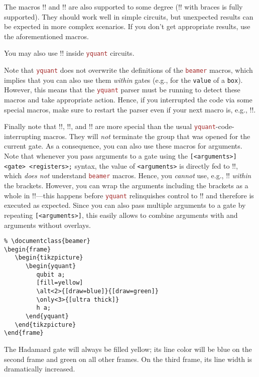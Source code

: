 \documentclass{scrartcl}
\def\pkg#1{\textcolor{brown}{\texttt{#1}}}
\def\ttlink{\link\texttt}
\def\Yquant{\pkg{yquant}}
\begin{document}
         The macros \tex!\pause! and \tex!\uncover! are also supported to some degree (\tex!\uncover! with braces is fully supported).
         They should work well in simple circuits, but unexpected results can be expected in more complex scenarios.
         If you don't get appropriate results, use the aforementioned macros.

         You may also use \tex!\note! inside \Yquant{} circuits.

         Note that \Yquant{} does not overwrite the definitions of the \pkg{beamer} macros, which implies that you can also use them \emph{within} gates (e.g., for the \ttlink{value} of a \ttlink{box}).
         However, this means that the \Yquant{} parser must be running to detect these macros and take appropriate action.
         Hence, if you interrupted the code via some special macros, make sure to restart the parser even if your next macro is, e.g., \tex!\only!.

         Finally note that \tex!\only!, \tex!\alt!, and \tex!\temporal! are more special than the usual \Yquant\hyp code\hyp interrupting macros.
         They will \emph{not} terminate the group that was opened for the current gate.
         As a consequence, you can also use these macros for arguments.
         Note that whenever you pass arguments to a gate using the \texttt{[<arguments>] <gate> <registers>;} syntax, the value of \texttt{<arguments>} is directly fed to \tex!\pgfkeys!, which \emph{does not} understand \pkg{beamer} macros.
         Hence, you \emph{cannot} use, e.g., \tex!\only! \emph{within} the brackets.
         However, you can wrap the arguments including the brackets as a whole in \tex!\only!---this happens before \Yquant{} relinquishes control to \tex!\pgfkeys! and therefore is executed as expected.
         Since you can also pass multiple arguments to a gate by repeating \texttt{[<arguments>]}, this easily allows to combine arguments with and arguments without overlays.
         \begin{example}
            \begin{verbatim}
% \documentclass{beamer}
\begin{frame}
   \begin{tikzpicture}
      \begin{yquant}
         qubit a;
         [fill=yellow]
         \alt<2>{[draw=blue]}{[draw=green]}
         \only<3>{[ultra thick]}
         h a;
      \end{yquant}
   \end{tikzpicture}
\end{frame}
            \end{verbatim}
            The Hadamard gate will always be filled yellow; its line color will be blue on the second frame and green on all other frames.
            On the third frame, its line width is dramatically increased.
         \end{example}
\end{document}
